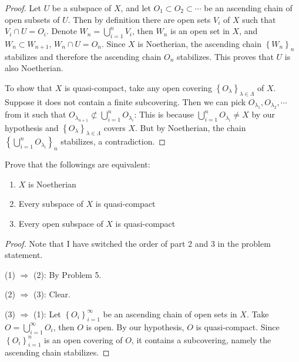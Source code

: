 \documentclass{solution}
\begin{document}
\begin{proof}
    Let $U$ be a subspace of $X$, and let $O_1 \subset O_2 \subset \cdots$ be an ascending chain of open subsets of $U$. Then by definition there are open sets $V_i$ of $X$ such that $V_i \cap U = O_i$. Denote $W_n = \bigcup\limits_{i = 1}^{n} V_i$, then $W_n$ is an open set in $X$, and $W_n \subset W_{n + 1}$, $W_n \cap U = O_n$. Since $X$ is Noetherian, the ascending chain $\left\lbrace W_n \right\rbrace_n$ stabilizes and therefore the ascending chain $O_n$ stabilizes. This proves that $U$ is also Noetherian.

    To show that $X$ is quasi-compact, take any open covering $\left\lbrace O_{\lambda} \right\rbrace_{\lambda \in \Lambda}$ of $X$. Suppose it does not contain a finite subcovering. Then we can pick $O_{\lambda_1}, O_{\lambda_2}, \cdots$ from it such that $O_{\lambda_{n + 1}} \not \subset \bigcup\limits_{i = 1}^{n} O_{\lambda_i}$: This is because $\bigcup\limits_{i = 1}^{n} O_{\lambda_i} \ne X$ by our hypothesis and $\left\lbrace O_{\lambda} \right\rbrace_{\lambda \in \Lambda}$ covers $X$. But by Noetherian, the chain $\left\lbrace \bigcup\limits_{i = 1}^{n} O_{\lambda_i} \right\rbrace_n$ stabilizes, a contradiction.
\end{proof}

\begin{problem}
    Prove that the followings are equivalent:
    \begin{enumerate}
        \item $X$ is Noetherian
        \item Every subspace of $X$ is quasi-compact
        \item Every open subspace of $X$ is quasi-compact
    \end{enumerate}
\end{problem}


\begin{proof}
    Note that I have switched the order of part 2 and 3 in the problem statement.

    (1) $\Rightarrow$ (2): By Problem 5.

    (2) $\Rightarrow$ (3): Clear.

    (3) $\Rightarrow$ (1): Let $\left\lbrace O_i \right\rbrace_{i = 1}^{\infty}$ be an ascending chain of open sets in $X$. Take $O = \bigcup\limits_{i = 1}^{\infty} O_i$, then $O$ is open. By our hypothesis, $O$ is quasi-compact. Since $\left\lbrace O_i \right\rbrace_{i = 1}^n$ is an open covering of $O$, it contains a subcovering, namely the ascending chain stabilizes.
\end{proof}
\end{document}
